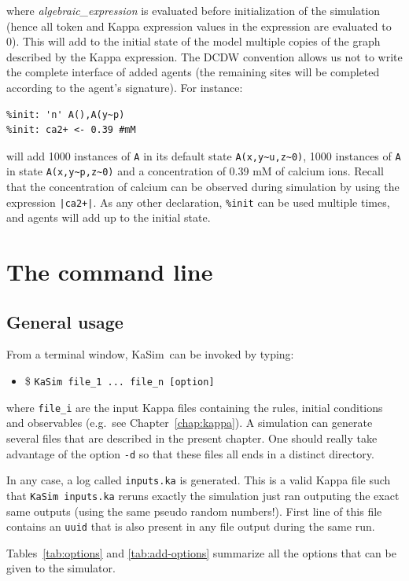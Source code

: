 \documentclass[11pt]{book}
\def\KaSim{\textsf{KaSim}}
\def\intstate{\textasciitilde}
\def\ttt#1{\texttt{#1}}
\def\eg{e.g.~}
\def\ITE#1{\begin{itemize}#1\end{itemize}}
\begin{document}
where \textit{algebraic\_expression} is evaluated before initialization of the simulation (hence all token and Kappa expression values in the expression are evaluated to 0). This will add to the initial state of the model multiple copies of the graph described by the Kappa expression. The DCDW convention allows us not to write the complete interface of added agents (the remaining sites will be completed according to the agent's signature). For instance:
\begin{lstlisting}[language=kappa]
%var: 'n' 1000
%init: 'n' A(),A(y~p)
%init: ca2+ <- 0.39 #mM
\end{lstlisting}
will add 1000 instances of \ttt{A} in its default state \ttt{A(x,y\intstate u,z\intstate 0)}, 1000 instances of \ttt{A} in state \ttt{A(x,y\intstate p,z\intstate 0)} and a concentration of 0.39 mM of calcium ions. Recall that the concentration of calcium can be observed during simulation by using the expression \ttt{|ca2+|}.
As any other declaration, \ttt{\%init} can be used multiple times, and agents will add up to the initial state.


\chapter{The command line}\label{chap:cl}

\section{General usage}
From a terminal window, \KaSim~can be invoked by typing:
\ITE{
\item[\$] \ttt{KaSim file\_1 ... file\_n [option] } } where
\ttt{file\_i} are the input Kappa files containing the rules, initial
conditions and observables ({\eg}see Chapter~\ref{chap:kappa}). A
simulation can generate several files that are described in the present chapter. One
should really take advantage of the option \ttt{-d} so that these files  all
ends in a distinct directory.

In any case, a log called \ttt{inputs.ka} is generated. This is a
valid Kappa file such that \ttt{KaSim inputs.ka} reruns exactly the
simulation just ran outputing the exact same outputs (using the same
pseudo random numbers!). First line of this file contains an \ttt{uuid}
that is also present in any file output during the same run.

Tables~\ref{tab:options} and \ref{tab:add-options} summarize all the
options that can be given to the simulator.
\end{document}
